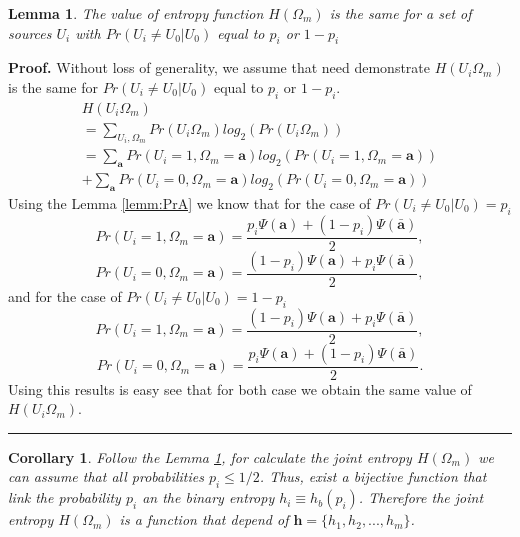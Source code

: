 \documentclass[a4paper,10pt]{article}
\newtheorem{corollary}[mytheorem]{Corollary}
\newtheorem{mylemma}[mytheorem]{Lemma}
\newenvironment{myproof}[1][Proof]{\textbf{#1.} }{\ \rule{0.5em}{0.5em}}
\begin{document}
\begin{mdframed}[style=MDFStyGrayScreen]
\begin{mylemma}
\label{lemm:hpi} 
The value of entropy function $H(\Omega_m)$ is the same for a set of sources
$U_i$ with $Pr(U_i\neq U_0|U_0)$ equal to $p_i$ or $1-p_i$
\end{mylemma}
\end{mdframed}
\begin{myproof}
 \label{proof:hpi} 
Without loss of generality, we assume that need demonstrate $H(U_i\Omega_{m})$
is the same for $Pr(U_i\neq U_0|U_0)$ equal to $p_i$ or $1-p_i$.
\begin{equation}\label{eq:hpi1}
\begin{matrix}
H(U_i\Omega_{m})\\
=\sum \limits_{U_i,\Omega_{m}} Pr(U_i\Omega_{m}) log_2(Pr(U_i\Omega_{m})) ~~~~~~~~~~~~~~~~~~~~\\
=\sum \limits_{\mathbf{a}} Pr(U_i=1,\Omega_{m}=\mathbf{a}) log_2(Pr(U_i=1,\Omega_{m}=\mathbf{a}))\\
+\sum \limits_{\mathbf{a}} Pr(U_i=0,\Omega_{m}=\mathbf{a}) log_2(Pr(U_i=0,\Omega_{m}=\mathbf{a}))
\end{matrix}
\end{equation}
Using the Lemma \ref{lemm:PrA} we know that for the case of $Pr(U_i\neq U_0|U_0)=p_i$ 
\begin{equation}\label{eq:hpi2}
Pr(U_i=1,\Omega_m=\mathbf{a})=\frac{ p_i\Psi(\mathbf{a}) + (1-p_i)\Psi(\mathbf{\bar{a}}) }{2},
\end{equation}
\begin{equation}\label{eq:hpi3}
Pr(U_i=0,\Omega_m=\mathbf{a})=\frac{ (1-p_i)\Psi(\mathbf{a}) + p_i\Psi(\mathbf{\bar{a}}) }{2},
\end{equation}
and for the case of $Pr(U_i\neq U_0|U_0)=1-p_i$
\begin{equation}\label{eq:hpi4}
Pr(U_i=1,\Omega_m=\mathbf{a})=\frac{ (1-p_i)\Psi(\mathbf{a}) + p_i\Psi(\mathbf{\bar{a}}) }{2},
\end{equation}
\begin{equation}\label{eq:hpi5}
Pr(U_i=0,\Omega_m=\mathbf{a})=\frac{ p_i\Psi(\mathbf{a}) + (1-p_i)\Psi(\mathbf{\bar{a}}) }{2}.
\end{equation}
Using this results is easy see that for both case  we obtain the same value of 
$H(U_i\Omega_{m})$.
\end{myproof}
\begin{corollary}
 \label{coro:hpi} 
Follow the Lemma \ref{lemm:hpi}, for calculate the joint entropy $H(\Omega_m)$ 
we can assume that all probabilities $p_i \leq 1/2$. Thus, exist a bijective 
function that link the probability $p_i$ an the binary entropy $h_i\equiv h_{b}(p_i)$. Therefore
the joint entropy $H(\Omega_m)$ is a function that depend of $\mathbf{h}=\{h_1, h_2, ..., h_m\}$.
\end{corollary}
\end{document}
